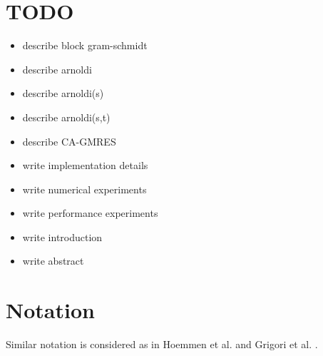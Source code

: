\documentclass{scrartcl}
\begin{document}
\pagebreak

\tableofcontents

\pagebreak
\section{TODO}
\begin{itemize}
\item describe block gram-schmidt
\item describe arnoldi
\item describe arnoldi(s)
\item describe arnoldi(s,t)
\item describe CA-GMRES
\item write implementation details
\item write numerical experiments
\item write performance experiments
\item write introduction
\item write abstract
\end{itemize}

\pagebreak
\section{Notation}
Similar notation is considered as in Hoemmen et al. \cite{Hoemmen:2010:CKS:1970638} and Grigori et al. \cite{Grigori}.
\end{document}
